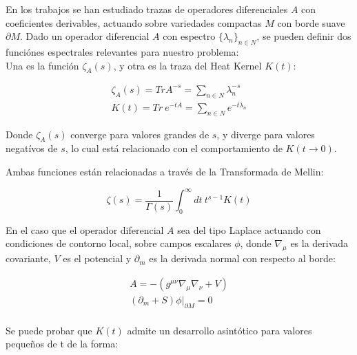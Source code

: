En los trabajos \cite{ Seeley:1967ea,10.2307/2373309,10.2307/2373312} se han estudiado trazas de operadores diferenciales $A$ con coeficientes derivables, actuando sobre variedades compactas $M$ con borde suave $\partial M$. Dado un operador diferencial $A$ con espectro $ \{ \lambda _n \} _{n \in N}$, se pueden definir dos funciónes espectrales relevantes para nuestro problema: \\


Una es la función $ \zeta _A (s)$, y otra es la traza del Heat Kernel $K(t)$:

\begin{equation}
\begin{array}{c}
\zeta _A (s) = Tr A ^{-s} = \sum \limits_{n \in N}   \lambda _n ^{-s} \\[10pt]
K (t) =  Tr \ e ^{-t A} = \sum \limits_{n \in N} e ^{-t \lambda _{n} }
\end{array}
\label{funcion.zeta}
\end{equation}

Donde $\zeta _A (s) $ converge para valores grandes de $s$, y diverge para valores negatívos de $s$, lo cual está relacionado con el comportamiento de $K(t \rightarrow 0 )$. 


Ambas funciones están relacionadas a través de la Transformada de Mellin:




\begin{equation}
\zeta (s) = \frac{1}{\Gamma (s) } 
\int _0 ^{\infty} dt \
t ^{s-1} K(t) 
\end{equation}


En el caso que el operador diferencial $A$ sea del tipo Laplace actuando con condiciones de contorno local, sobre campos escalares $\phi $, donde $\nabla _{\mu}$ es la derivada covariante, $V$ es el potencial y $\partial _m$ es la derivada normal con respecto al borde:

\begin{equation}
\begin{array}{c}

A = - \left(
			g ^{\mu \nu} \nabla _{\mu} \nabla _{\nu} + V
			\right) \\
\left (\partial _m + S \right) \phi | _{\partial M} = 0 \\[10pt]

\end{array}
\end{equation}

Se puede probar que $K(t)$ admite un desarrollo asintótico para valores pequeños de t  de la forma:

